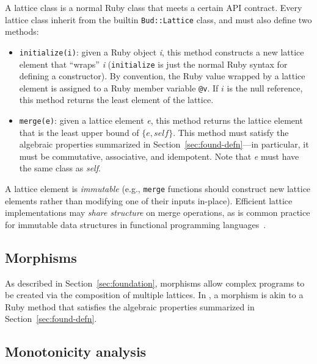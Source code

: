 A lattice class is a normal Ruby class that meets a certain API contract. Every
lattice class inherit from the builtin \texttt{Bud::Lattice} class, and
must also define two methods:
\begin{itemize}
\item \texttt{initialize(i)}: given a Ruby object \emph{i}, this method
  constructs a new lattice element that ``wraps'' \emph{i} (\texttt{initialize}
  is just the normal Ruby syntax for defining a constructor). By convention, the
  Ruby value wrapped by a lattice element is assigned to a Ruby member variable
  \texttt{@v}. If $i$ is the null reference, this method returns the least
  element of the lattice.

\item \texttt{merge(e)}: given a lattice element \emph{e}, this method returns the
  lattice element that is the least upper bound of $\{e, \textit{self}\}$. This method must
  satisfy the algebraic properties summarized in Section~\ref{sec:found-defn}---in
  particular, it must be commutative, associative, and idempotent. Note that
  \emph{e} must have the same class as \emph{self}.
\end{itemize}
A lattice element is \emph{immutable} (e.g., \texttt{merge} functions should
construct new lattice elements rather than modifying one of their inputs
in-place). Efficient lattice implementations may \emph{share structure} on merge
operations, as is common practice for immutable data structures in functional
programming languages~\cite{Okasaki1999}. %

\subsection{Morphisms}
As described in Section~\ref{sec:foundation}, morphisms allow complex programs
to be created via the composition of multiple lattices. In \lang, a morphism is
akin to a Ruby method that satisfies the algebraic properties summarized in
Section~\ref{sec:found-defn}.

\subsection{Monotonicity analysis}

